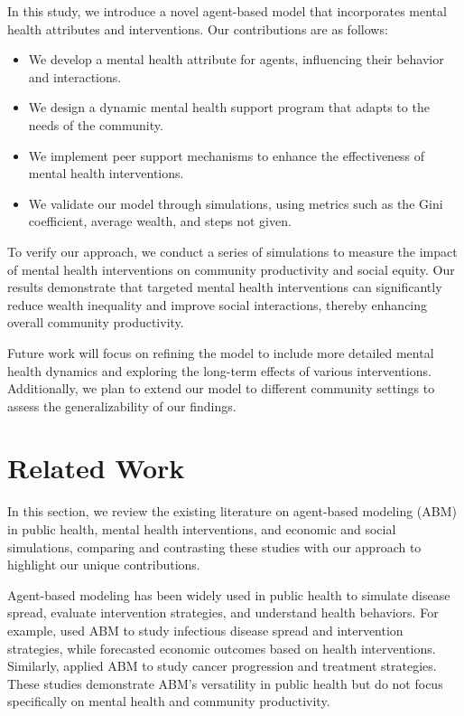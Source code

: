 \documentclass{article} %
\begin{document}
In this study, we introduce a novel agent-based model that incorporates mental health attributes and interventions. Our contributions are as follows:
\begin{itemize}
    \item We develop a mental health attribute for agents, influencing their behavior and interactions.
    \item We design a dynamic mental health support program that adapts to the needs of the community.
    \item We implement peer support mechanisms to enhance the effectiveness of mental health interventions.
    \item We validate our model through simulations, using metrics such as the Gini coefficient, average wealth, and steps not given.
\end{itemize}

To verify our approach, we conduct a series of simulations to measure the impact of mental health interventions on community productivity and social equity. Our results demonstrate that targeted mental health interventions can significantly reduce wealth inequality and improve social interactions, thereby enhancing overall community productivity.

Future work will focus on refining the model to include more detailed mental health dynamics and exploring the long-term effects of various interventions. Additionally, we plan to extend our model to different community settings to assess the generalizability of our findings.

\section{Related Work}
\label{sec:related}

In this section, we review the existing literature on agent-based modeling (ABM) in public health, mental health interventions, and economic and social simulations, comparing and contrasting these studies with our approach to highlight our unique contributions.

Agent-based modeling has been widely used in public health to simulate disease spread, evaluate intervention strategies, and understand health behaviors. For example, \citet{Zhang2022CombinationalRO} used ABM to study infectious disease spread and intervention strategies, while \citet{poledna2023economic} forecasted economic outcomes based on health interventions. Similarly, \citet{west2023agent} applied ABM to study cancer progression and treatment strategies. These studies demonstrate ABM's versatility in public health but do not focus specifically on mental health and community productivity.
\end{document}
